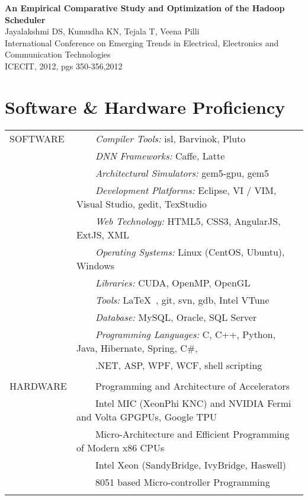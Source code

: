 \documentclass[a4paper,10pt]{article} %
\newcommand{\tabitem}{~~\llap{\textbullet}~~}
\begin{document}
\textbf{An Empirical Comparative Study and Optimization of the Hadoop Scheduler} \\
\small{Jayalakshmi DS, Kumudha KN, Tejala T, Veena Pilli}\\
\small{International Conference on Emerging Trends in Electrical, Electronics and 
Communication Technologies \\ ICECIT, 2012, pgs 350-356,2012}
\\
\newpage

\section{Software \& Hardware Proficiency}
\begin{tabular}{p{3cm}l}
SOFTWARE & \tabitem \textit{Compiler Tools:} isl, Barvinok, Pluto\\
& \tabitem \textit{DNN Frameworks:} Caffe, Latte\\
& \tabitem \textit{Architectural Simulators:} gem5-gpu, gem5\\
& \tabitem \textit{Development Platforms:} Eclipse, VI / VIM, Visual Studio, gedit, TexStudio\\
& \tabitem \textit{Web Technology:} HTML5, CSS3, AngularJS, ExtJS, XML\\
& \tabitem \textit{Operating Systems:} Linux (CentOS, Ubuntu), Windows \\
& \tabitem \textit{Libraries:} CUDA, OpenMP, OpenGL  \\
& \tabitem \textit{Tools:} \LaTeX\ , git, svn, gdb, Intel VTune\\
& \tabitem \textit{Database:} MySQL, Oracle, SQL Server\\
& \tabitem \textit{Programming Languages:} C, C++, Python, Java, Hibernate, Spring, C\#, \\
& ~~~~.NET, ASP, WPF, WCF, shell scripting\\

&\\

HARDWARE  & \tabitem Programming and Architecture of Accelerators \\
& ~~~~Intel MIC (XeonPhi KNC) and NVIDIA Fermi and Volta GPGPUs, Google TPU \\
& \tabitem Micro-Architecture and Efficient Programming of Modern x86 CPUs\\
& ~~~~Intel Xeon (SandyBridge, IvyBridge, Haswell) \\ 
& \tabitem 8051 based Micro-controller Programming \\
&\\
\end{tabular}
\\
\\
\end{document}
